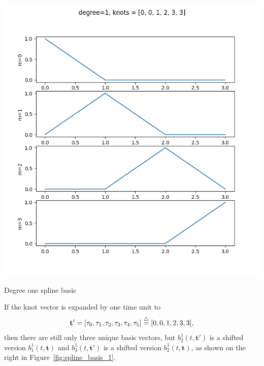\begin{marginfigure}[0in]
  	\includegraphics[width=\linewidth]{./chap5_trajectory_planning/figures/spline_basis_1_extra_knot}
  \caption{Degree one spline basis}
  \label{fig:spline_basis_1_extra_knot}  
\end{marginfigure}
If the knot vector is expanded by one time unit to
\[
\mathbf{t}' = [\tau_0, \tau_1, \tau_2, \tau_3, \tau_4, \tau_5] \stackrel{\triangle}{=} [0, 0, 1, 2, 3, 3],
\]
then there are still only three unique basis vectors, but 
$b_2^1(t,  \mathbf{t}')$ is a shifted version $b_1^1(t,  \mathbf{t})$ and $b_3^1(t,  \mathbf{t}')$ is a shifted version $b_2^1(t,  \mathbf{t})$, as shown on the right in Figure~\ref{fig:spline_basis_1}.

\clearpage


\par{}

